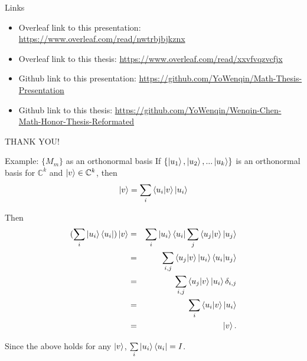 \documentclass[handout, 10 pt]{beamer}
\begin{document}
\begin{frame}{Links}
\begin{itemize}
    \item Overleaf link to this presentation: \href{https://www.overleaf.com/read/nwtrbjbjkznx}{https://www.overleaf.com/read/nwtrbjbjkznx}
    \item Overleaf link to this thesis:
    \href{https://www.overleaf.com/read/xxvfvqzvcfjx}{https://www.overleaf.com/read/xxvfvqzvcfjx}
    \item Github link to this presentation:
    \href{https://github.com/YoWenqin/Math-Thesis-Presentation}{https://github.com/YoWenqin/Math-Thesis-Presentation}
    \item Github link to this thesis:
    \href{https://github.com/YoWenqin/Wenqin-Chen-Math-Honor-Thesis-Reformated}{https://github.com/YoWenqin/Wenqin-Chen-Math-Honor-Thesis-Reformated}
    
\end{itemize}
\end{frame}

\begin{frame}


\begin{center}
\huge{THANK YOU!}

\end{center}

\end{frame}



\begin{frame}{Example: $\{M_m\}$ as an orthonormal basis }
 If $\{\ket{u_1}, \ket{u_2}, ...\ket{u_k}\}$ is an orthonormal basis for ${\mathbb{C}}^k$ and $\ket{v} \in {\mathbb{C}}^k$, then
$$\ket{v}=\sum\limits_i\braket{u_i|v}\ket{u_i}$$

Then
\begin{eqnarray*}
    (\sum_i \ket{u_i}\bra{u_i})\ket{v}&=&
    \sum_i \ket{u_i}\bra{u_i}\sum_j \braket{u_j|v} \ket{u_j}\\

    &=& \sum_{i,j}\braket{u_j|v}\ket{u_i}\braket{u_i|u_j}\\

    &=& \sum_{i,j}\braket{u_j|v}\ket{u_i}\delta_{i,j}\\

    &=&\sum_i \braket{u_i|v}\ket{u_i}\\
    &=&\ket{v}.
\end{eqnarray*}

Since the above holds for any $\ket{v}$, $\sum\limits_i \ket{u_i}\bra{u_i}=I$.   
\end{frame}
\end{document}
